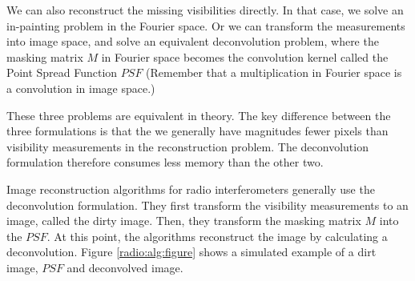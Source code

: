 We can also reconstruct the missing visibilities directly. In that case, we solve an in-painting problem in the Fourier space. Or we can transform the measurements into image space, and solve an equivalent deconvolution problem, where the masking matrix $M$ in Fourier space becomes the convolution kernel called the Point Spread Function $PSF$ (Remember that a multiplication in Fourier space is a convolution in image space.)

These three problems are equivalent in theory. The key difference between the three formulations is that the we generally have magnitudes fewer pixels than visibility measurements in the reconstruction problem. The deconvolution formulation therefore consumes less memory than the other two.

Image reconstruction algorithms for radio interferometers generally use the deconvolution formulation. They first transform the visibility measurements to an image, called the dirty image. Then, they transform the masking matrix $M$ into the $PSF$. At this point, the algorithms reconstruct the image by calculating a deconvolution. Figure \ref{radio:alg:figure} shows a simulated example of a dirt image, $PSF$ and deconvolved image.

